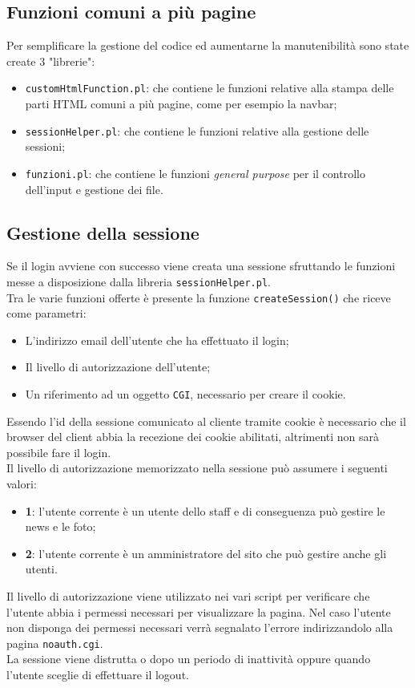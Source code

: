 \subsection{Funzioni comuni a più pagine}

Per semplificare la gestione del codice ed aumentarne la manutenibilità sono state create 3 "librerie":
\begin{itemize}
\item \texttt{customHtmlFunction.pl}: che contiene le funzioni relative alla stampa delle parti HTML comuni a più pagine, come per esempio la navbar;
\item \texttt{sessionHelper.pl}: che contiene le funzioni relative alla gestione delle sessioni;
\item \texttt{funzioni.pl}: che contiene le funzioni \textit{general purpose} per il controllo dell'input e gestione dei file.
\end{itemize}


\subsection{Gestione della sessione}

Se il login avviene con successo viene creata una sessione sfruttando le funzioni messe a disposizione dalla libreria \texttt{sessionHelper.pl}.\\
Tra le varie funzioni offerte è presente la funzione \texttt{createSession()} che riceve come parametri:
\begin{itemize}
\item L'indirizzo email dell'utente che ha effettuato il login;
\item Il livello di autorizzazione dell'utente;
\item Un riferimento ad un oggetto \texttt{CGI}, necessario per creare il cookie.
\end{itemize}
Essendo l'id della sessione comunicato al cliente tramite cookie è necessario che il browser del client abbia la recezione dei cookie abilitati, altrimenti non sarà possibile fare il login.\\
Il livello di autorizzazione memorizzato nella sessione può assumere i seguenti valori:
\begin{itemize}
\item \textbf{1}: l'utente corrente è un utente dello staff e di conseguenza può gestire le news e le foto;
\item \textbf{2}: l'utente corrente è un amministratore del sito che può gestire anche gli utenti.
\end{itemize}
Il livello di autorizzazione viene utilizzato nei vari script per verificare che l'utente abbia i permessi necessari per visualizzare la pagina. Nel caso l'utente non disponga dei permessi necessari verrà segnalato l'errore indirizzandolo alla pagina \texttt{noauth.cgi}.\\
La sessione viene distrutta o dopo un periodo di inattività oppure quando l'utente sceglie di effettuare il logout.
